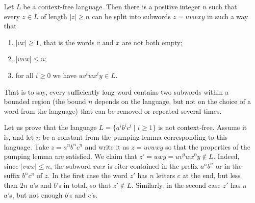 \begin{page}
\setcounter{section}{7}
\setcounter{subsection}{2}
\setcounter{dfn}{3}
\label{portion:1299}

\begin{thm}
\label{thm:PumpCFL}
Let $L$ be a context-free language.
Then there is a positive integer $n$ such that every $z \in L$ of length $|z| \ge n$ can be split into subwords $z = uvwxy$ in such a way that
\begin{enumerate}
\item
$|vx| \ge 1$, that is the words $v$ and $x$ are not both empty;
\item
$|vwx| \le n$;
\item
for all $i \ge 0$ we have $uv^iwx^iy \in L$.
\end{enumerate}
\end{thm}

\end{page}

\begin{page}
\setcounter{section}{7}
\setcounter{subsection}{2}
\setcounter{dfn}{3}
\label{portion:1300}

That is to say, every sufficiently long word contains two subwords within a bounded region
(the bound $n$ depends on the language, but not on the choice of a word from the language)
that can be removed or repeated several times.


\end{page}

\begin{page}
\setcounter{section}{7}
\setcounter{subsection}{2}
\setcounter{dfn}{4}
\label{portion:1302}

\begin{exl}
Let us prove that the language $L = \{a^ib^ic^i \mid i \ge 1\}$ is not context-free.
Assume it is, and let $n$ be a constant from the pumping lemma corresponding to this language.
Take $z = a^nb^nc^n$ and write it as $z = uvwxy$ so that the properties of the pumping lemma are satisfied.
We claim that $z' = uwy = uv^0wx^0y \notin L$.
Indeed, since $|vwx| \le n$, the subword $vwx$ is eiter contained in the prefix $a^nb^n$ or in the suffix $b^nc^n$ of $z$.
In the first case the word $z'$ has $n$ letters $c$ at the end, but less than $2n$ $a$'s and $b$'s in total, so that $z' \notin L$.
Similarly, in the second case $z'$ has $n$ $a$'s, but not enough $b$'s and $c$'s.
\end{exl}

\end{page}

